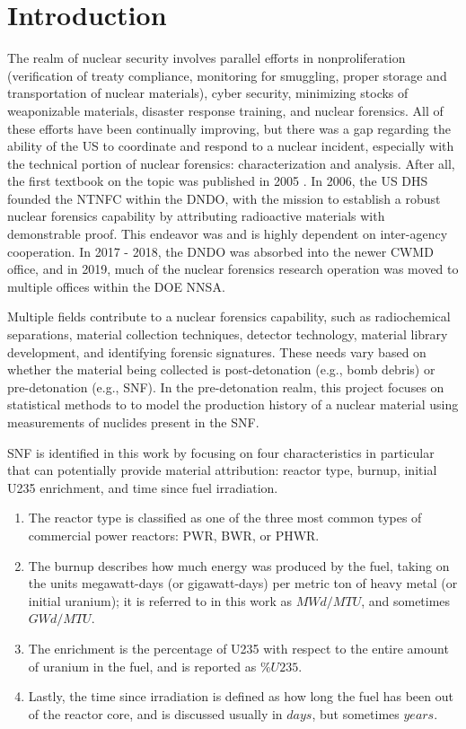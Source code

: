 \chapter{Introduction}
\label{ch:intro}

The realm of nuclear security involves parallel efforts in nonproliferation
(verification of treaty compliance, monitoring for smuggling, proper storage and
transportation of nuclear materials), cyber security, minimizing stocks of
weaponizable materials, disaster response training, and nuclear forensics. All
of these efforts have been continually improving, but there was a gap regarding
the ability of the \gls{US} to coordinate and respond to a nuclear incident,
especially with the technical portion of nuclear forensics: characterization and
analysis. After all, the first textbook on the topic was published in 2005
\cite{nftext_2005}. In 2006, the \gls{US} \gls{DHS} founded the \gls{NTNFC}
within the \gls{DNDO}, with the mission to establish a robust nuclear forensics
capability by attributing radioactive materials with demonstrable proof. This
endeavor was and is highly dependent on inter-agency cooperation. In 2017 \--
2018, the \gls{DNDO} was absorbed into the newer \gls{CWMD} office, and in 2019,
much of the nuclear forensics research operation was moved to multiple offices
within the \gls{DOE} \gls{NNSA}. 

Multiple fields contribute to a nuclear forensics capability, such as
radiochemical separations, material collection techniques, detector technology,
material library development, and identifying forensic signatures. These needs
vary based on whether the material being collected is post-detonation (e.g.,
bomb debris) or pre-detonation (e.g., \gls{SNF}).  In the
pre-detonation realm, this project focuses on statistical methods to to model
the production history of a nuclear material using measurements of nuclides
present in the \gls{SNF}.

\gls{SNF} is identified in this work by focusing on four characteristics in
particular that can potentially provide material attribution: reactor type,
burnup, initial \gls{U235} enrichment, and time since fuel irradiation. 
\begin{enumerate}
  \item The reactor type is classified as one of the three most common types of
  commercial power reactors: \gls{PWR}, \gls{BWR}, or \gls{PHWR}. 
  \item The burnup describes how much energy was produced by the fuel, taking
  on the units megawatt-days (or gigawatt-days) per metric ton of heavy metal
  (or initial uranium); it is referred to in this work as $MWd/MTU$, and
  sometimes $GWd/MTU$.  
  \item The enrichment is the percentage of \gls{U235} with respect to the
  entire amount of uranium in the fuel, and is reported as $\%U235$. 
  \item Lastly, the time since irradiation is defined as how long the fuel has
  been out of the reactor core, and is discussed usually in $days$, but
  sometimes $years$. 
\end{enumerate}

